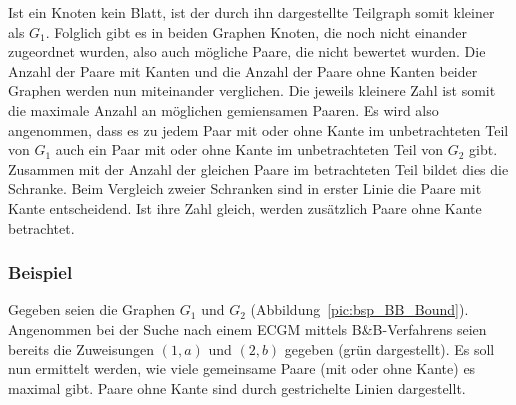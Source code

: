 Ist ein Knoten kein Blatt, ist der durch ihn dargestellte Teilgraph 
somit kleiner als $G_1$. Folglich gibt es in beiden Graphen Knoten, 
die noch nicht einander zugeordnet wurden, also auch mögliche Paare, 
die nicht bewertet wurden. Die Anzahl der Paare mit Kanten und die 
Anzahl der Paare ohne Kanten beider Graphen werden nun miteinander 
verglichen. Die jeweils kleinere Zahl ist somit die maximale Anzahl 
an möglichen gemiensamen Paaren.
Es wird also angenommen, dass es zu jedem Paar mit oder 
ohne Kante im unbetrachteten Teil von $G_1$ auch ein Paar mit oder 
ohne Kante im unbetrachteten Teil von $G_2$ gibt. Zusammen mit der 
Anzahl der gleichen Paare im betrachteten Teil bildet dies die 
Schranke. Beim Vergleich zweier Schranken sind in erster Linie die 
Paare mit Kante entscheidend. Ist ihre Zahl gleich, werden 
zusätzlich Paare ohne Kante betrachtet. 

\subsubsection{Beispiel}
Gegeben seien die Graphen $G_1$ und $G_2$ (Abbildung~\ref{pic:bsp_BB_Bound}). 
Angenommen bei der Suche nach einem ECGM mittels B\&B-Verfahrens 
seien bereits die Zuweisungen $(1,a)$ und $(2,b)$ gegeben (grün dargestellt). 
Es soll nun ermittelt werden, wie viele gemeinsame Paare (mit oder ohne Kante) 
es maximal gibt. Paare ohne Kante sind durch gestrichelte Linien dargestellt.
%
%    
%    
%  
%    
%
%    
%    
%    
%  

